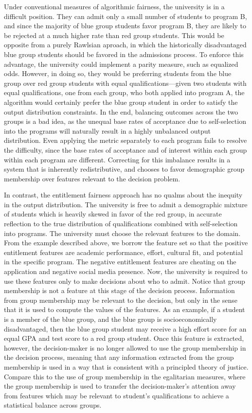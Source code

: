 Under conventional measures of algorithmic fairness, the university is in a 
difficult position. They can admit only a small number of students to program B,
and since the majority of blue group students favor program B, they are likely
to be rejected at a much higher rate than red group students. This would be
opposite from a purely Rawlsian aproach, in which the historically disadvantaged
blue group students should be favored in the admissions process. To enforce this
advantage, the university could implement a parity measure, such as equalized
odds. However, in doing so, they would be preferring students from the blue
group over red group students with equal qualifications—given two students with
equal qualifications, one from each group, who both applied into program A, the
algorithm would certainly prefer the blue group student in order to satisfy the
output distribution constraints. In the end, balancing outcomes across the two
groups is a bad idea, as the unequal base rates of acceptance due to
self-selection into the programs will naturally result in a highly unbalanced
output distribution. Even applying the metric separately to each program fails
to resolve the difficulty, since the base rates of acceptance and of interest
within each group within each program are different. Correcting for this
imbalance results in a system that is inherently redistributive, and chooses to
favor demographic group membership over features relevant to the decision
problem.

In contrast, the entitlement fairness approach has no qualms about the inequity
in the output distribution. The university is free to admit a demographic 
mixture of students which is heavily skewed in favor of the red group, in 
accurate reflection to the true distribution of qualifications combined with 
self-selection into programs. The university must choose the relevant features
to the domain. From the example described above, we borrow the feature set so
that the positive entitlement features are academic performance, effort,
cultural fit, and potential in the specific program. The negative entitlement 
features are cheating on the application and negative social media presence.
Now, the university is required to use these features only to make decisions
about who to admit. Notice that group membership is not a feature at this stage
of the decision process. Information from group membership may be relevant to
the decision, but only in the sense that it is used to compute the values of the
features. As an example, if a student is a member of the blue group, and the 
blue group is socioeconomically disadvantaged, then the blue group student may
receive a high effort score for an equal GPA and test score to a red group
student. Once this feature is extracted, however, the decision-maker is no 
longer allowed to use the group membership in the decision process, meaning that
any information extracted from the group membership is used in a way that is
consistent with a principled theory of justice. Compare this to the use of group
membership in the egalitarian measures, where the group membership is used to 
transfer the decision-maker's attention away from features which may be relevant
to student's qualifications to achieve a statistical balance across groups.

